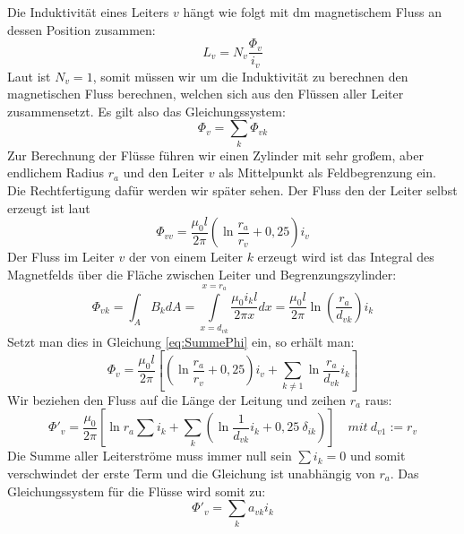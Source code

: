 Die Induktivität eines Leiters $v$ hängt wie folgt mit dm magnetischem Fluss an dessen Position zusammen:
\begin{equation}
L_v = N_v \frac{\Phi_v}{i_v}
\end{equation}
Laut \cite{Flosdorff}\cite{Moeller} %
ist $N_v = 1$, somit müssen wir um die Induktivität zu berechnen den magnetischen Fluss berechnen, welchen sich aus den Flüssen aller Leiter zusammensetzt. Es gilt also das Gleichungssystem:
\begin{equation}\label{eq:SummePhi}
\Phi_v = \sum_k \Phi_{vk}
\end{equation}
Zur Berechnung der Flüsse führen wir einen Zylinder mit sehr großem, aber endlichem Radius $r_a$ und den Leiter $v$ als Mittelpunkt als Feldbegrenzung ein. Die Rechtfertigung dafür werden wir später sehen.
Der Fluss den der Leiter selbst erzeugt ist laut \cite{Moeller}\cite{Flosdorff} %
\begin{equation}
\Phi_{vv} = \frac{\mu_0l}{2\pi} \left( \ln\frac{r_a}{r_v} + 0,25 \right) i_v
\end{equation}
Der Fluss im Leiter $v$ der von einem Leiter $k$ erzeugt wird ist das Integral des Magnetfelds über die Fläche zwischen Leiter und Begrenzungszylinder:
\begin{equation}
\Phi_{vk} = \int_A B_k dA = \int\limits_{x=d_{vk}}^{x=r_a} \frac{\mu_0i_k l}{2\pi x}dx =
\frac{\mu_0l}{2\pi}\ln\left(\frac{r_a}{d_{vk}}\right) i_k
\end{equation}
Setzt man dies in Gleichung \ref{eq:SummePhi} ein, so erhält man:
\begin{equation}
\Phi_v = \frac{\mu_0l}{2\pi} \left[ \left( \ln\frac{r_a}{r_v} +0,25\right) i_v + \sum_{k\neq1}\ln\frac{r_a}{d_{vk}} i_k \right]
\end{equation}
Wir beziehen den Fluss auf die Länge der Leitung und zeihen $r_a$ raus:
\begin{equation}
\Phi'_v = \frac{\mu_0}{2\pi}
 \left[
   \ln r_a \sum i_k +
   \sum_k \left( \ln\frac{1}{d_{vk}} i_k +
   0,25 \: \delta_{ik} \right)
 \right]
\quad mit \: d_{v1}:=r_v
\end{equation}
Die Summe aller Leiterströme muss immer null sein $\sum i_k=0$ und somit verschwindet der erste Term und die Gleichung ist unabhängig von $r_a$. Das Gleichungssystem für die Flüsse wird somit zu:
\begin{equation}
\Phi'_v = \sum_k a_{vk}i_k
\end{equation}
